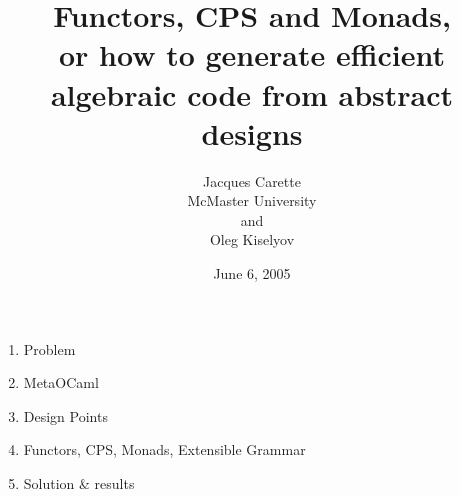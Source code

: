 \documentclass[landscape]{slides}
\begin{document}
\pagestyle{empty}

\setlength{\topmargin}{0in}
\setlength{\headheight}{0.0in}
\setlength{\headsep}{0in}
\setlength{\topskip}{0in}
\setlength{\footskip}{0in}

\newcommand{\vsi}{\vspace{-5mm}}
\newcommand{\vsii}{\vspace{-7mm}}
\newcommand{\vsiii}{\vspace{-11mm}}

\newcommand{\seq}[1]{{\langle #1 \rangle}}
\newcommand{\set}[1]{{\{ #1 \}}}
\newcommand{\tuple}[1]{{( #1 )}}
\newcommand{\mname}[1]{\mbox{\sf #1}}
\newcommand{\Nat}{\mathbb N}


\begin{slide}
\title{Functors, CPS and Monads,\\
or how to generate efficient algebraic code from abstract designs}
\author{Jacques Carette\\
McMaster University\\
and\\
Oleg Kiselyov}
\date{June 6, 2005}
\maketitle
\end{slide}

\begin{slide}
\begin{enumerate}
    \item Problem
    \item MetaOCaml
    \item Design Points
    \item Functors, CPS, Monads, Extensible Grammar
    \item Solution \& results
\end{enumerate}

\end{slide}
\end{document}
